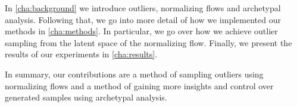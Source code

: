 In \autoref{cha:background} we introduce outliers, normalizing flows and
archetypal analysis. Following that, we go into more detail of how we
implemented our methods in \autoref{cha:methods}. In particular, we go over how
we achieve outlier sampling from the latent space of the normalizing flow.
Finally, we present the results of our experiments in \autoref{cha:results}.

In summary, our contributions are a method of sampling outliers using
normalizing flows and a method of gaining more insights and control over generated
samples using archetypal analysis.
